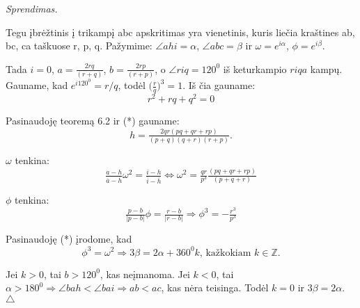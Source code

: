 \documentclass[11pt,a4paper,twoside]{book}
\newenvironment{sprendimas}{\noindent \textit{Sprendimas.}}{\hfill $\triangle$}
\theoremstyle{definition} \newtheorem*{api}{Apibrėžimas}
\theoremstyle{remark} \newtheorem*{pastaba}{Pastaba}
\begin{document}
\begin{sprendimas}


Tegu įbrėžtinis į trikampį abc apskritimas yra vienetinis, kuris liečia kraštines ab, bc, ca taškuose r, p, q. Pažymime: $\angle ahi = \alpha$, $\angle abc = \beta$ ir $\omega = e^{i\alpha}$, $\phi = e^{i\beta}$.

Tada $i=0$, $a=\tfrac{2rq}{(r+q)}$, $b=\tfrac{2rp}{(r+p)}$, o $\angle riq=120^0$ iš keturkampio $riqa$ kampų. Gauname, kad $e^{i120^0}=r/q$, todėl $\Big(\tfrac{r}{q}\Big)^3=1$. Iš čia gauname:
\begin{equation*}
r^2 + rq + q^2 = 0 \tag{*}
\end{equation*}

Pasinaudoję teoremą 6.2 ir (*) gauname:
\begin{equation*}
h=\tfrac{2qr(pq +qr+rp)}{(p+q)(q+r)(r+p)}.
\end{equation*}

$\omega$ tenkina:
\begin{equation*}
\tfrac{a-h}{\overline{a}-\overline{h}}\omega^2=\tfrac{i-h}{\overline{i}-\overline{h}} \Leftrightarrow \omega^2=\tfrac{qr}{p^3}\tfrac{(pq +qr+rp)}{(p+q+r)}
\end{equation*}

$\phi$ tenkina:
\begin{equation*}
\tfrac{p-b}{|p-b|}\phi=\tfrac{r-b}{|r-b|} \Rightarrow \phi^3=-\tfrac{r^3}{p^3}
\end{equation*}

Pasinaudoję (*) įrodome, kad 
\begin{equation*}
\phi^3=\omega^2 \Rightarrow 3\beta=2\alpha + 360^0k \text{, kažkokiam } k\in\mathbb{Z}.
\end{equation*}

Jei $k>0$, tai $b>120^0$, kas neįmanoma. Jei $k<0$, tai $\alpha > 180^0 \Rightarrow \angle bah < \angle bai \Rightarrow ab<ac$, kas nėra teisinga. Todėl $k=0$ ir $3\beta=2\alpha$.
\end{sprendimas}
\end{document}
